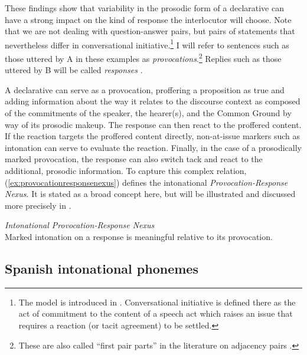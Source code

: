 These findings show that variability in the prosodic form of a declarative can have a strong impact on the kind of response the interlocutor will choose. Note that we are not dealing with question-answer pairs, but pairs of statements that nevertheless differ in conversational initiative.\footnote{The model is introduced in . Conversational initiative is defined there as the act of commitment to the content of a speech act which raises an issue that requires a reaction (or tacit agreement) to be settled.} I will refer to sentences such as those uttered by A in these examples as \textit{provocations}.\footnote{These are also called ``first pair parts'' in the literature on adjacency pairs \citep{SacksSchegloffJefferson.1974,SchegloffSacks.1973}.} Replies such as those uttered by B will be called \textit{responses} \citep{FarkasBruce.2010}.

A declarative can serve as a provocation, proffering a proposition as true and adding information about the way it relates to the discourse context as composed of the commitments of the speaker, the hearer(s), and the Common Ground by way of its prosodic makeup. The response can then react to the proffered content. If the reaction targets the proffered content directly, non-at-issue markers such as intonation can serve to evaluate the reaction. Finally, in the case of a prosodically marked provocation, the response can also switch tack and react to the additional, prosodic information. To capture this complex relation, (\ref{ex:provocationresponsenexus}) defines the intonational \textit{Provocation-Response Nexus}. It is stated as a broad concept here, but will be illustrated and discussed more precisely in .

\begin{exe}
	\ex \label{ex:provocationresponsenexus} \textit{Intonational Provocation-Response Nexus} \\
	Marked intonation on a response is meaningful relative to its provocation.
\end{exe}


\subsection{Spanish intonational phonemes}
\label{ch:2.3.3}

